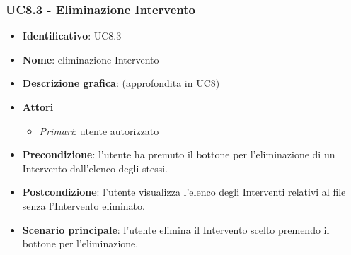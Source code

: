\subsubsection{UC8.3 - Eliminazione Intervento}
\begin{itemize}
  \item \textbf{Identificativo}: UC8.3
  \item \textbf{Nome}: eliminazione Intervento
  \item \textbf{Descrizione grafica}: (approfondita in UC8)
  \item \textbf{Attori}
        \begin{itemize}
          \item \textit{Primari}: utente autorizzato
        \end{itemize}
  \item \textbf{Precondizione}: l'utente ha premuto il bottone per l'eliminazione di un Intervento dall'elenco degli stessi.
  \item \textbf{Postcondizione}: l'utente visualizza l'elenco degli Interventi relativi al file senza l'Intervento eliminato.
  \item \textbf{Scenario principale}: l'utente elimina il Intervento scelto premendo il bottone per l'eliminazione.
\end{itemize}